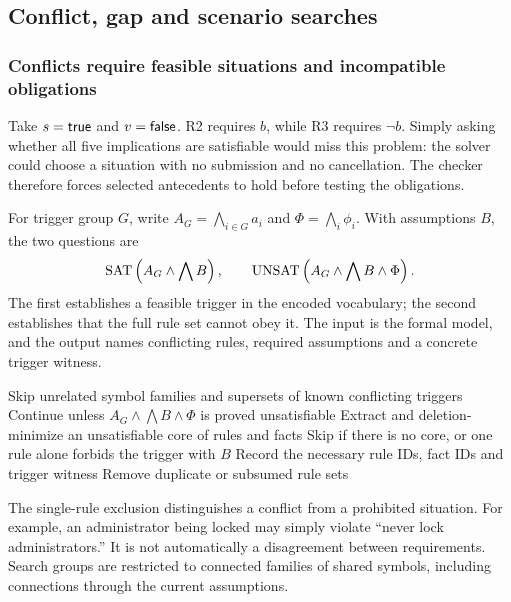 \subsection{Conflict, gap and scenario searches}\label{app:solver}

\subsubsection{Conflicts require feasible situations and incompatible obligations}
Take $s=\mathsf{true}$ and $v=\mathsf{false}$. R2 requires $b$, while R3 requires
$\neg b$. Simply asking whether all five implications are satisfiable
would miss this problem: the solver could choose a situation with no
submission and no cancellation. The checker therefore forces selected
antecedents to hold before testing the obligations.

For trigger group $G$, write $A_G=\bigwedge_{i\in G}a_i$ and
$\Phi=\bigwedge_i\phi_i$. With assumptions $B$, the two questions are
\[
 \operatorname{SAT}\left(A_G\land\bigwedge B\right),\qquad
 \operatorname{UNSAT}\left(A_G\land\bigwedge B\land\Phi\right).
\]
The first establishes a feasible trigger in the encoded vocabulary; the
second establishes that the full rule set cannot obey it. The input is
the formal model, and the output names conflicting rules, required
assumptions and a concrete trigger witness.

\begin{algorithm}[H]
\caption{Search for conflicts under a chosen assumption set}\label{alg:conflicts}
\begin{algorithmic}[1]
  \State Skip unrelated symbol families and supersets of known conflicting triggers
    \State Continue unless $A_G\land\bigwedge B\land\Phi$ is proved unsatisfiable
    \State Extract and deletion-minimize an unsatisfiable core of rules and facts
    \State Skip if there is no core, or one rule alone forbids the trigger with $B$
    \State Record the necessary rule IDs, fact IDs and trigger witness
  \EndIf
\EndFor
\State Remove duplicate or subsumed rule sets
\end{algorithmic}
\end{algorithm}

The single-rule exclusion distinguishes a conflict from a prohibited
situation. For example, an administrator being locked may simply violate
``never lock administrators.'' It is not automatically a disagreement
between requirements. Search groups are restricted to connected families
of shared symbols, including connections through the current assumptions.

